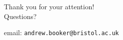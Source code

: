 \documentclass[t]{beamer} %
\begin{document}
\begin{frame}
\frametitle{}
\begin{center}
\large{Thank you for your attention!}\\
\vspace{1cm}
Questions?
\vspace{2cm}

email: \texttt{andrew.booker@bristol.ac.uk}
\end{center}
\end{frame}
\end{document}
